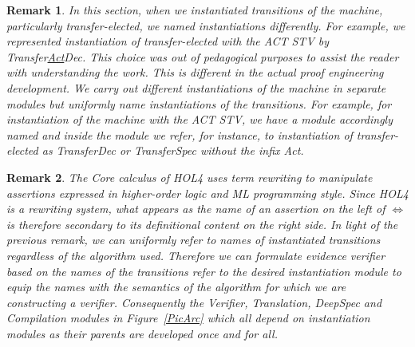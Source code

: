 \documentclass[10pt,conference]{IEEEtran}
\newtheorem{remark}{Remark}
\begin{document}
\begin{remark}\label{naming}
In this section, when we instantiated transitions of the machine,
particularly transfer-elected, we named instantiations differently.
For example, we represented instantiation of transfer-elected with
the ACT STV by  Transfer\underline{Act}Dec. This choice was out of
pedagogical purposes to assist the reader with understanding the
work. This is different in the actual proof engineering development.  We carry out different instantiations of the machine in separate modules but uniformly name instantiations of the transitions. For example, for instantiation of the machine with the ACT STV, we have a module accordingly named and inside the module we refer, for instance, to instantiation of transfer-elected as TransferDec or TransferSpec without the infix Act.
\end{remark}
\begin{remark}\label{rewrting}
The Core calculus of HOL4 uses \emph{term rewriting} to manipulate assertions expressed in higher-order logic and ML programming style.   
Since HOL4 is a rewriting system, what appears as the name of an
assertion on the left of $\Leftrightarrow$ is therefore secondary to
its definitional content on the right side. In light of the previous
remark, we can uniformly refer to \emph{names} of instantiated
transitions regardless of the algorithm used. Therefore we can
formulate evidence verifier based on the names of the transitions
refer to the desired instantiation  module to equip the names with
the semantics  of the algorithm for which we are constructing a
verifier. Consequently the Verifier, Translation, DeepSpec and Compilation modules in Figure~\ref{PicArc} which all depend on instantiation modules as their parents  are  developed once and for all.   
\end{remark}

 
\end{document}
